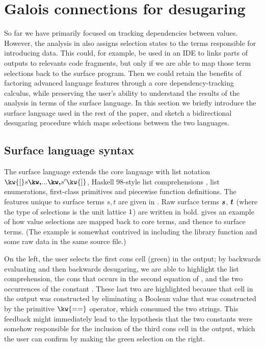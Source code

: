 \newpage
\section{Galois connections for desugaring}
\label{sec:surface-language}

 So far we have primarily focused on tracking dependencies between values. However, the analysis in  also assigns selection states to the terms responsible for introducing data. This could, for example, be used in an IDE to links parts of outputs to relevants code fragments, but only if we are able to map those term selections back to the surface program. Then we could retain the benefits of factoring advanced language features through a core dependency-tracking calculus, while preserving the user's ability to understand the results of the analysis in terms of the surface language. In this section we briefly introduce the surface language \OurLanguage{} used in the rest of the paper, and sketch a bidirectional desugaring procedure which maps selections between the two languages.




\subsection{Surface language syntax}

The surface language \OurLanguage{} extends the core language with list notation $\kw{[} s \comma \ldots \comma s' \kw{]}$, Haskell 98-style list comprehensions \cite{peytonJones03}, list enumerations, first-class primitives and piecewise function definitions. The features unique to surface terms $s, t$ are given in . Raw surface terms $\bm{s}$, $\bm{t}$ (where the type of selections is the unit lattice $1$) are written in bold.  gives an example of how value selections are mapped back to core terms, and thence to surface terms. (The example is somewhat contrived in including the library function  and some raw data in the same source file.)

On the left, the user selects the first cons cell (green) in the output; by backwards evaluating and then backwards desugaring, we are able to highlight the list comprehension, the cons that occurs in the second equation of , and the two occurrences of the constant . These last two are highlighted because that cell in the output was constructed by eliminating a Boolean value that was constructed by the primitive $\kw{==}$ operator, which consumed the two strings. This feedback might immediately lead to the hypothesis that the two constants  were somehow responsible for the inclusion of the third cons cell in the output, which the user can confirm by making the green selection on the right.

